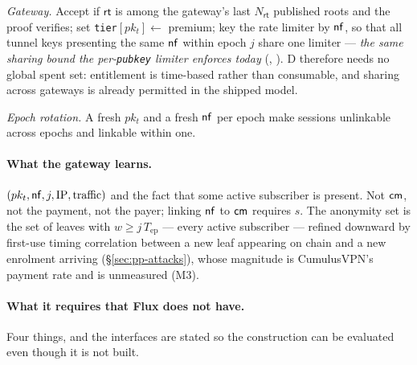 \begin{construction}
\emph{Gateway.} Accept if $\mathsf{rt}$ is among the gateway's last $N_{\mathsf{rt}}$ published roots
and the proof verifies; set \texttt{tier}$[pk_t] \gets$ premium; key the rate limiter by $\mathsf{nf}$, so
that all tunnel keys presenting the same $\mathsf{nf}$ within epoch $j$ share one limiter --- \emph{the same
sharing bound the per-\texttt{pubkey} limiter enforces today}
(\shipped, ). D therefore needs no
global spent set: entitlement is time-based rather than consumable, and sharing across gateways is
already permitted in the shipped model.

\emph{Epoch rotation.} A fresh $pk_t$ and a fresh $\mathsf{nf}$ per epoch make sessions unlinkable across
epochs and linkable within one.
\end{construction}

\paragraph{What the gateway learns.} $(pk_t, \mathsf{nf}, j, \mathrm{IP}, \text{traffic})$ and the fact that
some active subscriber is present. Not $\mathsf{cm}$, not the payment, not the payer; linking $\mathsf{nf}$ to $\mathsf{cm}$
requires $s$. The anonymity set is the set of leaves with $w \ge j\,T_{\mathrm{ep}}$ --- every active
subscriber --- refined downward by first-use timing correlation between a new leaf appearing on chain
and a new enrolment arriving (\S\ref{sec:pp-attacks}), whose magnitude is CumulusVPN's payment rate
and is unmeasured (M3).

\paragraph{What it requires that Flux does not have.} Four things, and the interfaces are stated so
the construction can be evaluated even though it is not built.


